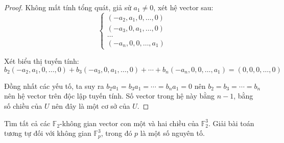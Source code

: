 \begin{proof}
    Không mất tính tổng quát, giả sử $a_{1}\ne 0$, xét hệ vector sau:
    \[
        \begin{cases}
            (-a_{2}, a_{1}, 0, \ldots, 0) \\
            (-a_{3}, 0, a_{1}, \ldots, 0) \\
            \ldots                        \\
            (-a_{n}, 0, 0, \ldots, a_{1})
        \end{cases}
    \]
    
    Xét biểu thị tuyến tính:
    \[ b_{2}(-a_{2}, a_{1}, 0, \ldots, 0) + b_{3}(-a_{3}, 0, a_{1}, \ldots, 0) + \cdots + b_{n}(-a_{n}, 0, 0, \ldots, a_{1}) = (0,0,0,\ldots, 0) \]
    
    Đồng nhất các yếu tố, ta suy ra $b_{2}a_{1} = b_{3}a_{1} = \cdots = b_{n}a_{1} = 0$ nên $b_{2} = b_{3} = \cdots = b_{n}$ nên hệ vector trên độc lập tuyến tính. Số vector trong hệ này bằng $n - 1$, bằng số chiều của $U$ nên đây là một cơ sở của $U$.
\end{proof}

\begin{exercise}
    Tìm tất cả các $\mathbb{F}_{2}$-không gian vector con một và hai chiều của $\mathbb{F}^{3}_{2}$. Giải bài toán tương tự đối với không gian $\mathbb{F}^{3}_{p}$, trong đó $p$ là một số nguyên tố.
\end{exercise}

